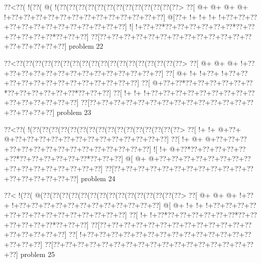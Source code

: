\vbox{\vbox{\goo
\0??<\0??(\- !(\0??(\- @(\- !(\0??(\0??(\0??(\0??(\0??(\0??(\0??(\0??(\0??(\0??(\0??(\0??(\0??>
\0??[\- @+\- @+\- @+\- @+\- !+\0??+\0??+\0??+\0??+\0??+\0??+\0??+\0??+\0??+\0??+\0??+\0??+\0??]
\- @[\0??+\- !+\- !+\- !+\- !+\0??+\0??+\0??+\0??+\0??+\0??+\0??+\0??+\0??+\0??+\0??+\0??+\0??]
\- ![\- !+\0??+\0??*\0??+\0??+\0??+\0??+\0??+\0??*\0??+\0??+\0??+\0??+\0??+\0??*\0??+\0??+\0??]
\0??[\0??+\0??+\0??+\0??+\0??+\0??+\0??+\0??+\0??+\0??+\0??+\0??+\0??+\0??+\0??+\0??+\0??+\0??]
}
\hfil problem 22\hfil\break
}



\vbox{\vbox{\goo
\0??<\0??(\0??(\0??(\0??(\0??(\0??(\0??(\0??(\0??(\0??(\0??(\0??(\0??(\0??(\0??(\0??(\0??(\0??>
\0??[\- @+\- @+\- @+\- !+\0??+\0??+\0??+\0??+\0??+\0??+\0??+\0??+\0??+\0??+\0??+\0??+\0??+\0??]
\0??[\- @+\- !+\- !+\0??+\- !+\0??+\0??+\0??+\0??+\0??+\0??+\0??+\0??+\0??+\0??+\0??+\0??+\0??]
\0??[\- @+\0??+\0??*\0??+\0??+\0??+\0??+\0??+\0??*\0??+\0??+\0??+\0??+\0??+\0??*\0??+\0??+\0??]
\0??[\- !+\- !+\- !+\0??+\0??+\0??+\0??+\0??+\0??+\0??+\0??+\0??+\0??+\0??+\0??+\0??+\0??+\0??]
\0??[\0??+\0??+\0??+\0??+\0??+\0??+\0??+\0??+\0??+\0??+\0??+\0??+\0??+\0??+\0??+\0??+\0??+\0??]
}
\hfil problem 23\hfil\break
}



\vbox{\vbox{\goo
\0??<\0??(\- !(\0??(\0??(\0??(\0??(\0??(\0??(\0??(\0??(\0??(\0??(\0??(\0??(\0??(\0??(\0??(\0??>
\0??[\- !+\- !+\- @+\0??+\- @+\0??+\0??+\0??+\0??+\0??+\0??+\0??+\0??+\0??+\0??+\0??+\0??+\0??]
\0??[\- !+\- @+\- @+\0??+\0??+\0??+\0??+\0??+\0??+\0??+\0??+\0??+\0??+\0??+\0??+\0??+\0??+\0??]
\- ![\- !+\- @+\0??*\0??+\0??+\0??+\0??+\0??+\0??*\0??+\0??+\0??+\0??+\0??+\0??*\0??+\0??+\0??]
\- @[\- @+\- @+\0??+\0??+\0??+\0??+\0??+\0??+\0??+\0??+\0??+\0??+\0??+\0??+\0??+\0??+\0??+\0??]
\0??[\0??+\0??+\0??+\0??+\0??+\0??+\0??+\0??+\0??+\0??+\0??+\0??+\0??+\0??+\0??+\0??+\0??+\0??]
}
\hfil problem 24\hfil\break
}



\vbox{\vbox{\goo
\0??<\- !(\0??(\- @(\0??(\0??(\0??(\0??(\0??(\0??(\0??(\0??(\0??(\0??(\0??(\0??(\0??(\0??(\0??>
\0??[\- @+\- @+\- @+\- !+\0??+\- !+\0??+\0??+\0??+\0??+\0??+\0??+\0??+\0??+\0??+\0??+\0??+\0??]
\- @[\- @+\- !+\- !+\- !+\0??+\0??+\0??+\0??+\0??+\0??+\0??+\0??+\0??+\0??+\0??+\0??+\0??+\0??]
\0??[\- !+\- !+\0??*\0??+\0??+\0??+\0??+\0??+\0??*\0??+\0??+\0??+\0??+\0??+\0??*\0??+\0??+\0??]
\0??[\0??+\0??+\0??+\0??+\0??+\0??+\0??+\0??+\0??+\0??+\0??+\0??+\0??+\0??+\0??+\0??+\0??+\0??]
\0??[\- !+\0??+\0??+\0??+\0??+\0??+\0??+\0??+\0??+\0??+\0??+\0??+\0??+\0??+\0??+\0??+\0??+\0??]
\0??[\0??+\0??+\0??+\0??+\0??+\0??+\0??+\0??+\0??+\0??+\0??+\0??+\0??+\0??+\0??+\0??+\0??+\0??]
}
\hfil problem 25\hfil\break
}



